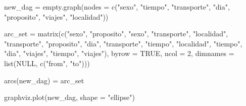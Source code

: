 \documentclass[
  11pt,
  a4paper,
]{article}
\newenvironment{Shaded}{\begin{snugshade}}{\end{snugshade}}
\newcommand{\AttributeTok}[1]{\textcolor[rgb]{0.40,0.45,0.13}{#1}}
\newcommand{\ConstantTok}[1]{\textcolor[rgb]{0.56,0.35,0.01}{#1}}
\newcommand{\DecValTok}[1]{\textcolor[rgb]{0.68,0.00,0.00}{#1}}
\newcommand{\FunctionTok}[1]{\textcolor[rgb]{0.28,0.35,0.67}{#1}}
\newcommand{\NormalTok}[1]{\textcolor[rgb]{0.00,0.23,0.31}{#1}}
\newcommand{\OtherTok}[1]{\textcolor[rgb]{0.00,0.23,0.31}{#1}}
\newcommand{\StringTok}[1]{\textcolor[rgb]{0.13,0.47,0.30}{#1}}
\begin{document}
\begin{Shaded}
\begin{Highlighting}[numbers=left,,]
\NormalTok{new\_dag }\OtherTok{=} \FunctionTok{empty.graph}\NormalTok{(}\AttributeTok{nodes =} \FunctionTok{c}\NormalTok{(}\StringTok{"sexo"}\NormalTok{, }\StringTok{"tiempo"}\NormalTok{, }\StringTok{"transporte"}\NormalTok{, }\StringTok{"dia"}\NormalTok{, }\StringTok{"proposito"}\NormalTok{, }\StringTok{"viajes"}\NormalTok{, }\StringTok{"localidad"}\NormalTok{))}
\end{Highlighting}
\end{Shaded}

\begin{Shaded}
\begin{Highlighting}[numbers=left,,]
\NormalTok{arc\_set }\OtherTok{=} \FunctionTok{matrix}\NormalTok{(}\FunctionTok{c}\NormalTok{(}\StringTok{"sexo"}\NormalTok{, }\StringTok{"proposito"}\NormalTok{,}
                   \StringTok{"sexo"}\NormalTok{, }\StringTok{"transporte"}\NormalTok{,}
                   \StringTok{"localidad"}\NormalTok{, }\StringTok{"transporte"}\NormalTok{,}
                   \StringTok{"proposito"}\NormalTok{, }\StringTok{"dia"}\NormalTok{,}
                   \StringTok{"transporte"}\NormalTok{, }\StringTok{"tiempo"}\NormalTok{,}
                   \StringTok{"localidad"}\NormalTok{, }\StringTok{"tiempo"}\NormalTok{,}
                   \StringTok{"dia"}\NormalTok{, }\StringTok{"viajes"}\NormalTok{,}
                   \StringTok{"tiempo"}\NormalTok{, }\StringTok{"viajes"}\NormalTok{), }\AttributeTok{byrow =} \ConstantTok{TRUE}\NormalTok{, }\AttributeTok{ncol =} \DecValTok{2}\NormalTok{,}
                 \AttributeTok{dimnames =} \FunctionTok{list}\NormalTok{(}\ConstantTok{NULL}\NormalTok{, }\FunctionTok{c}\NormalTok{(}\StringTok{"from"}\NormalTok{, }\StringTok{"to"}\NormalTok{)))}
\end{Highlighting}
\end{Shaded}

\begin{Shaded}
\begin{Highlighting}[numbers=left,,]
\FunctionTok{arcs}\NormalTok{(new\_dag) }\OtherTok{=}\NormalTok{ arc\_set}
\end{Highlighting}
\end{Shaded}

\begin{Shaded}
\begin{Highlighting}[numbers=left,,]
\FunctionTok{graphviz.plot}\NormalTok{(new\_dag, }\AttributeTok{shape =} \StringTok{"ellipse"}\NormalTok{)}
\end{Highlighting}
\end{Shaded}
\end{document}
